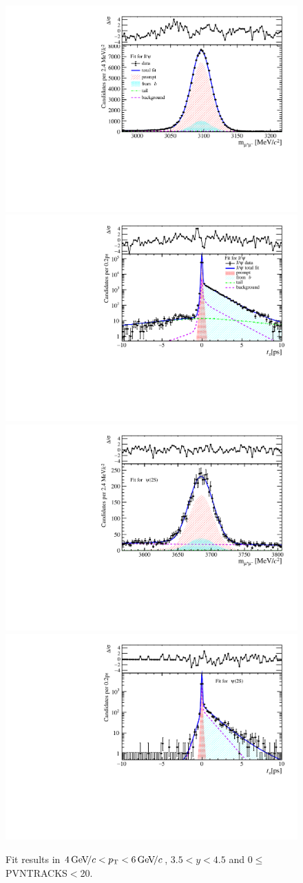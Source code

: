 \begin{figure}[H]
\begin{center}
\includegraphics[width=0.47\linewidth]{pdf/Jpsi/drawmass/n1y3pt3.pdf}
\includegraphics[width=0.47\linewidth]{pdf/Jpsi/2DFit/n1y3pt3.pdf}
\vspace*{-0.5cm}
\includegraphics[width=0.47\linewidth]{pdf/Psi2S/drawmass/n1y3pt3.pdf}
\includegraphics[width=0.47\linewidth]{pdf/Psi2S/2DFit/n1y3pt3.pdf}
\vspace*{-0.5cm}
\end{center}
\caption{Fit results in $4\text{\,Ge\kern -0.1em V\!/}c<p_{\mathrm{T}}<6\text{\,Ge\kern -0.1em V\!/}c$, $3.5<y<4.5$ and 0$\leq$PVNTRACKS$<$20.}
\label{Fitn1y3pt3}
\end{figure}
